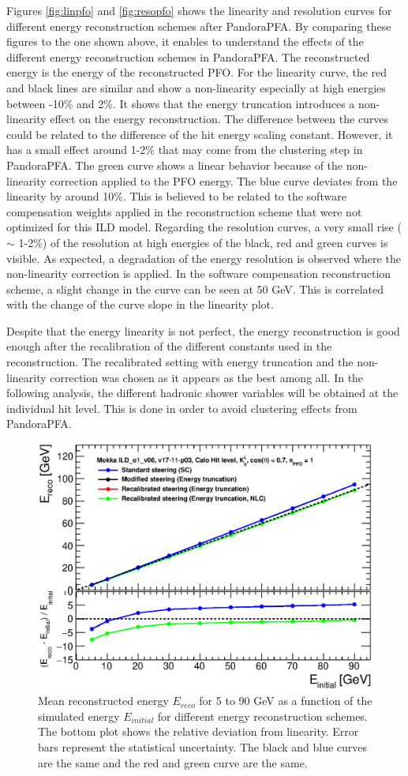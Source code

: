 Figures \ref{fig:linpfo} and \ref{fig:resopfo} shows the linearity and resolution curves for different energy reconstruction schemes after PandoraPFA. By comparing these figures to the one shown above, it enables to understand the effects of the different energy reconstruction schemes in PandoraPFA. The reconstructed energy is the energy of the reconstructed PFO. For the linearity curve, the red and black lines are similar and show a non-linearity especially at high energies between -10\% and 2\%. It shows that the energy truncation introduces a non-linearity effect on the energy reconstruction. The difference between the curves could be related to the difference of the hit energy scaling constant. However, it has a small effect around 1-2\% that may come from the clustering step in PandoraPFA. The green curve shows a linear behavior because of the non-linearity correction applied to the PFO energy. The blue curve deviates from the linearity by around 10\%. This is believed to be related to the software compensation weights applied in the reconstruction scheme that were not optimized for this ILD model. Regarding the resolution curves, a very small rise ($\sim$ 1-2\%) of the resolution at high energies of the black, red and green curves is visible. As expected, a degradation of the energy resolution is observed where the non-linearity correction is applied. In the software compensation reconstruction scheme, a slight change in the curve can be seen at 50 GeV. This is correlated with the change of the curve slope in the linearity plot.

Despite that the energy linearity is not perfect, the energy reconstruction is good enough after the recalibration of the different constants used in the reconstruction. The recalibrated setting with energy truncation and the non-linearity correction was chosen as it appears as the best among all. In the following analysis, the different hadronic shower variables will be obtained at the individual hit level. This is done in order to avoid clustering effects from PandoraPFA.

\begin{figure}[htbp!]
  \centering
  \includegraphics[width=0.6\linewidth]{../Thesis_Plots/ILD/CheckCalib/Comparison_linearity_Curves_Hits.eps}
  \caption{Mean reconstructed energy $E_{reco}$ for 5 to 90 GeV \kzeroL{} as a function of the simulated energy $E_{initial}$ for different energy reconstruction schemes. The bottom plot shows the relative deviation from linearity. Error bars represent the statistical uncertainty. The black and blue curves are the same and the red and green curve are the same.} \label{fig:linhits}
\end{figure}

